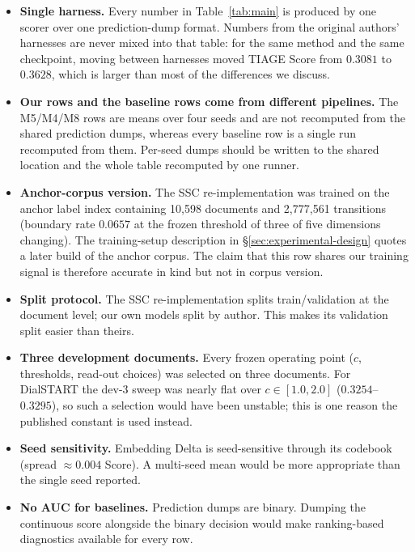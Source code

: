\begin{itemize}\itemsep3pt
\item \textbf{Single harness.} Every number in Table~\ref{tab:main} is produced
      by one scorer over one prediction-dump format. Numbers from the original
      authors' harnesses are never mixed into that table: for the same method
      and the same checkpoint, moving between harnesses moved TIAGE Score from
      $0.3081$ to $0.3628$, which is larger than most of the differences we
      discuss.
\item \textbf{Our rows and the baseline rows come from different pipelines.}
      The M5/M4/M8 rows are means over four seeds and are not recomputed from
      the shared prediction dumps, whereas every baseline row is a single run
      recomputed from them. Per-seed dumps should be written to the shared
      location and the whole table recomputed by one runner.
\item \textbf{Anchor-corpus version.} The SSC re-implementation was trained on
      the anchor label index containing 10{,}598 documents and 2{,}777{,}561
      transitions (boundary rate $0.0657$ at the frozen threshold of three of
      five dimensions changing). The training-setup description in
      \S\ref{sec:experimental-design} quotes a later build of the anchor corpus.
      The claim that this row shares our training signal is therefore accurate
      in kind but not in corpus version.
\item \textbf{Split protocol.} The SSC re-implementation splits train/validation
      at the document level; our own models split by author. This makes its
      validation split easier than theirs.
\item \textbf{Three development documents.} Every frozen operating point
      ($c$, thresholds, read-out choices) was selected on three documents. For
      DialSTART the dev-3 sweep was nearly flat over $c\in[1.0,2.0]$
      ($0.3254$--$0.3295$), so such a selection would have been unstable; this
      is one reason the published constant is used instead.
\item \textbf{Seed sensitivity.} Embedding Delta is seed-sensitive through its
      codebook (spread $\approx 0.004$ Score). A multi-seed mean would be more
      appropriate than the single seed reported.
\item \textbf{No AUC for baselines.} Prediction dumps are binary. Dumping the
      continuous score alongside the binary decision would make ranking-based
      diagnostics available for every row.
\end{itemize}
